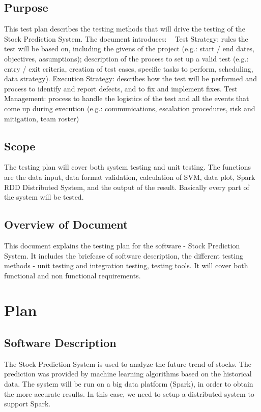 \documentclass[12pt, titlepage]{article}
\begin{document}
\subsection{Purpose}
This test plan describes the testing methods that will drive the testing of the Stock Prediction System. The document introduces:
~\newline
Test Strategy: rules the test will be based on, including the givens of the project (e.g.: start / end dates, objectives, assumptions); description of the process to set up a valid test (e.g.: entry / exit criteria, creation of test cases, specific tasks to perform, scheduling, data strategy).
Execution Strategy: describes how the test will be performed and process to identify and report defects, and to fix and implement fixes.
Test Management: process to handle the logistics of the test and all the events that come up during execution (e.g.: communications, escalation procedures, risk and mitigation, team roster)\\
\subsection{Scope}
The testing plan will cover both system testing and unit testing. The functions are the data input, data format validation, calculation of SVM, data plot, Spark RDD Distributed System, and the output of the result. Basically every part of the system will be tested.
\subsection{Overview of Document}
This document explains the testing plan for the software - Stock Prediction System. It includes the briefcase of software description, the different testing methods - unit testing and integration testing, testing tools. It will cover both functional and non functional requirements.
\section{Plan}
\subsection{Software Description}
The Stock Prediction System is used to analyze the future trend of stocks. The prediction was provided by machine learning algorithms based on the historical data. 
The system will be run on a big data platform (Spark), in order to obtain the more accurate results. In this case, we need to setup a distributed system to support Spark.
\end{document}
